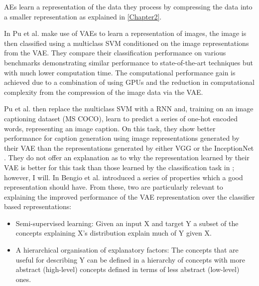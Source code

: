 \acp{AE} learn a representation of the data they process by compressing the data into a smaller representation as explained in \autoref{Chapter2}.

In \cite{pu2016variational} Pu et al. make use of \acp{VAE} to learn a representation of images, the image is then classified using a multiclass \ac{SVM} conditioned on the image representations from the \ac{VAE}. They compare their classification performance on various benchmarks demonstrating similar performance to state-of-the-art techniques but with much lower computation time. The computational performance gain is achieved due to a combination of using \acp{GPU} and the reduction in computational complexity from the compression of the image data via the \ac{VAE}.

Pu et al. then replace the multiclass \ac{SVM} with a \ac{RNN} and, training on an image captioning dataset (MS COCO\cite{lin2014microsoft}), learn to predict a series of one-hot encoded words, representing an image caption. On this task, they show better performance for caption generation using image representations generated by their \ac{VAE} than the representations generated by either VGG \cite{simonyan2014very} or the InceptionNet \cite{szegedy2015going}. They do not offer an explanation as to why the representation learned by their \ac{VAE} is better for this task than those learned by the classification task in \cite{simonyan2014very, szegedy2015going}; however, I will.
In \cite{repRev} Bengio et al. introduced a series of properties which a good representation should have. From these, two are particularly relevant to explaining the improved performance of the \ac{VAE} representation over the classifier based representations:
\\
\begin{itemize}
	\item Semi-supervised learning: Given an input X and target Y a subset of the concepts explaining X's distribution explain much of Y given X.
	\item A hierarchical organisation of explanatory factors: The concepts that are useful for describing Y can be defined in a hierarchy of concepts with more abstract (high-level) concepts defined in terms of less abstract (low-level) ones.
	\vspace{1em}
\end{itemize}


